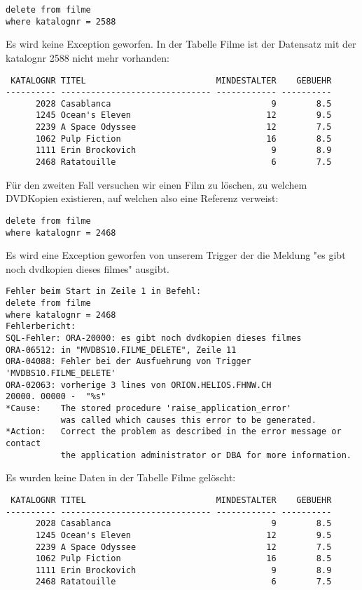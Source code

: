 \documentclass[11pt,a4paper,parskip=half]{scrartcl}
\begin{document}
\begin{lstlisting}
delete from filme
where katalognr = 2588
\end{lstlisting}

Es wird keine Exception geworfen. In der Tabelle Filme ist der Datensatz mit der katalognr 2588 nicht mehr vorhanden:

\begin{lstlisting}
 KATALOGNR TITEL                          MINDESTALTER    GEBUEHR
---------- ------------------------------ ------------ ----------
      2028 Casablanca                                9        8.5 
      1245 Ocean's Eleven                           12        9.5 
      2239 A Space Odyssee                          12        7.5 
      1062 Pulp Fiction                             16        8.5 
      1111 Erin Brockovich                           9        8.9 
      2468 Ratatouille                               6        7.5 
\end{lstlisting}

Für den zweiten Fall versuchen wir einen Film zu löschen, zu welchem DVDKopien existieren, auf welchen also eine Referenz verweist:

\begin{lstlisting}
delete from filme
where katalognr = 2468
\end{lstlisting}

Es wird eine Exception geworfen von unserem Trigger der die Meldung "es gibt noch dvdkopien dieses filmes" ausgibt.

\begin{lstlisting}
Fehler beim Start in Zeile 1 in Befehl:
delete from filme
where katalognr = 2468
Fehlerbericht:
SQL-Fehler: ORA-20000: es gibt noch dvdkopien dieses filmes
ORA-06512: in "MVDBS10.FILME_DELETE", Zeile 11
ORA-04088: Fehler bei der Ausfuehrung von Trigger 'MVDBS10.FILME_DELETE'
ORA-02063: vorherige 3 lines von ORION.HELIOS.FHNW.CH
20000. 00000 -  "%s"
*Cause:    The stored procedure 'raise_application_error'
           was called which causes this error to be generated.
*Action:   Correct the problem as described in the error message or contact
           the application administrator or DBA for more information.
\end{lstlisting}

Es wurden keine Daten in der Tabelle Filme gelöscht:

\begin{lstlisting}
 KATALOGNR TITEL                          MINDESTALTER    GEBUEHR
---------- ------------------------------ ------------ ----------
      2028 Casablanca                                9        8.5 
      1245 Ocean's Eleven                           12        9.5 
      2239 A Space Odyssee                          12        7.5 
      1062 Pulp Fiction                             16        8.5 
      1111 Erin Brockovich                           9        8.9 
      2468 Ratatouille                               6        7.5 
\end{lstlisting}
\end{document}
